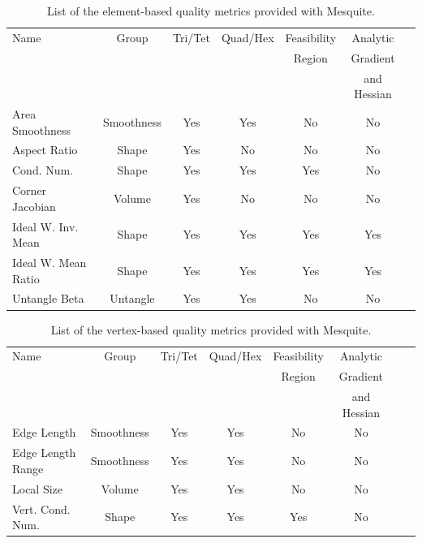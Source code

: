 \begin{table}[!hp]
\begin{center}
\begin{tabular}{|l|c|c|c|c|c|c|}
\hline
Name               & Group      & Tri/Tet & Quad/Hex & Feasibility & Analytic  \\
                   &            &         &          & Region      & Gradient \\
                   &            &         &          &             & and Hessian   \\  
\hline
Area Smoothness    & Smoothness & Yes     & Yes      & No          & No    \\
Aspect Ratio       & Shape      & Yes     & No       & No          & No    \\
Cond. Num.         & Shape      & Yes     & Yes      & Yes         & No    \\
Corner Jacobian    & Volume     & Yes     & No       & No          & No    \\
Ideal W. Inv. Mean & Shape      & Yes     & Yes      & Yes         & Yes   \\
Ideal W. Mean Ratio& Shape      & Yes     & Yes      & Yes         & Yes   \\
Untangle Beta      & Untangle   & Yes     & Yes      & No          & No    \\
\hline
\end{tabular}
\caption{List of the element-based quality metrics provided with Mesquite.}
\label{Element Metrics}
\end{center}
\end{table}

\begin{table}[!hp]
\begin{center}
\begin{tabular}{|l|c|c|c|c|c|c|c|}
\hline
Name               & Group      & Tri/Tet & Quad/Hex  & Feasibility & Analytic  \\
                   &            &         &           & Region      & Gradient   \\
                   &            &         &           &             & and Hessian   \\  

\hline
Edge Length        & Smoothness & Yes     & Yes       & No          & No         \\
Edge Length Range  & Smoothness & Yes     & Yes       & No          & No         \\
Local Size         & Volume     & Yes     & Yes       & No          & No         \\
Vert. Cond. Num.   & Shape      & Yes     & Yes       & Yes         & No         \\
\hline
\end{tabular}
\caption{List of the vertex-based quality metrics provided with Mesquite.}
\label{Vertex Metrics}
\end{center}
\end{table}


